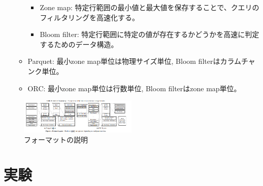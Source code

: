 \documentclass[uplatex]{jsarticle}
\theoremstyle{remark}
\begin{document}
\begin{itemize}
\begin{itemize}
    \begin{itemize}
      \item Zone map: 特定行範囲の最小値と最大値を保存することで、クエリのフィルタリングを高速化する。
      \item Bloom filter: 特定行範囲に特定の値が存在するかどうかを高速に判定するためのデータ構造。
    \end{itemize}
    \item Parquet: 最小zone map単位は物理サイズ単位, Bloom filterはカラムチャンク単位。
    \item ORC: 最小zone map単位は行数単位, Bloom filterはzone map単位。
  \end{itemize}
\end{itemize}

\begin{figure}
  \centering
  \includegraphics[width=0.5\textwidth]{img/columnar_storage_format/columnar_storage_format_format.png}
  \caption{フォーマットの説明}
  \label{fig:storage-format}
\end{figure}

\section{実験}
\end{document}
